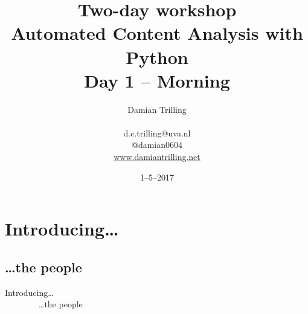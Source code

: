 \documentclass{beamer}
\begin{document}
\title[Automated Content Analysis with Python]{\textbf{Two-day workshop\\ Automated Content Analysis with Python} \\ Day 1 -- Morning}
\author[Damian Trilling]{Damian Trilling \\ ~ \\ \footnotesize{d.c.trilling@uva.nl \\@damian0604} \\ \url{www.damiantrilling.net}}
\date{1--5--2017}



\begin{frame}{}
\titlepage
\end{frame}





\section{Introducing\ldots}
\subsection{\ldots the people}

\begin{frame}
	Introducing\ldots \\
	~~~~~~~~\ldots the people
\end{frame}
\end{document}
